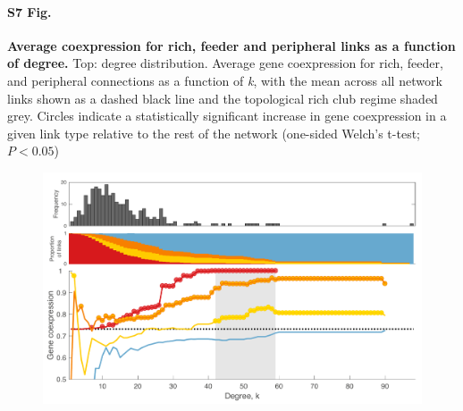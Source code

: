 \documentclass[10pt,letterpaper]{article}
\begin{document}
\paragraph*{S7 Fig.}
{\bf Average coexpression for rich, feeder and peripheral links as a function of degree.}
Top: degree distribution. Average gene coexpression for rich, feeder, and peripheral connections as a function of \textit{k}, with the mean across all network links shown as a dashed black line and the topological rich club regime shaded grey.
Circles indicate a statistically significant increase in gene coexpression in a given link type relative to the rest of the network (one-sided Welch’s t-test; $P < 0.05$)
\begin{figure}[!h]
\label{S7_Fig}
\centering
    \includegraphics[width=1\textwidth]{coXmeanCoexpression.pdf}
\end{figure}
\end{document}
